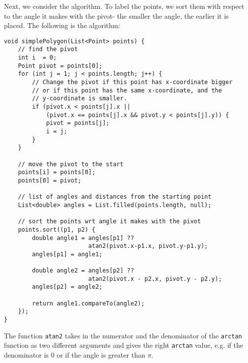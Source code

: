 \documentclass[a4paper, openany]{memoir}
\begin{document}
Next, we consider the algorithm. To label the points, we sort them with respect to the angle it makes with the pivot- the smaller the angle, the earlier it is placed. The following is the algorithm:
\begin{lstlisting}[language=pseudocode]
void simplePolygon(List<Point> points) {
    // find the pivot
    int i  = 0;
    Point pivot = points[0];
    for (int j = 1; j < points.length; j++) {
        // Change the pivot if this point has x-coordinate bigger 
        // or if this point has the same x-coordinate, and the 
        // y-coordinate is smaller.
        if (pivot.x < points[j].x || 
            (pivot.x == points[j].x && pivot.y < points[j].y)) {
            pivot = points[j];
            i = j;
        }
    }
    
    // move the pivot to the start
    points[i] = points[0];
    points[0] = pivot;
    
    // list of angles and distances from the starting point
    List<double> angles = List.filled(points.length, null);
    
    // sort the points wrt angle it makes with the pivot
    points.sort((p1, p2) {
        double angle1 = angles[p1] ?? 
                        atan2(pivot.x-p1.x, pivot.y-p1.y);
        angles[p1] = angle1;
    
        double angle2 = angles[p2] ?? 
                        atan2(pivot.x - p2.x, pivot.y - p2.y);
        angles[p2] = angle2;
    
        return angle1.compareTo(angle2);
    });
}
\end{lstlisting}
The function \texttt{atan2} takes in the numerator and the denominator of the \texttt{arctan} function as two different arguments and gives the right \texttt{arctan} value, e.g. if the denominator is 0 or if the angle is greater than $\pi$.
\end{document}
